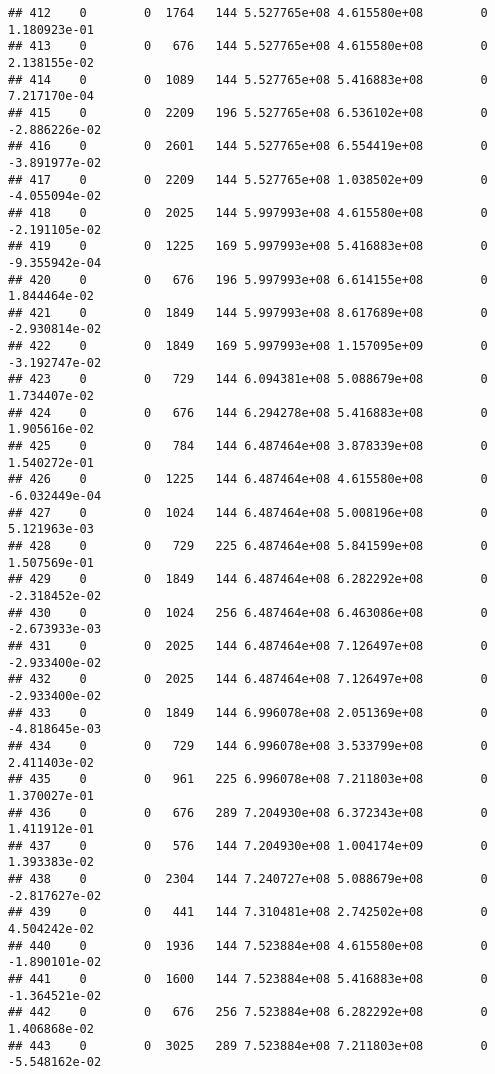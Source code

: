 \documentclass[
]{article}
\begin{document}
\begin{enumerate}
\begin{verbatim}
## 412    0        0  1764   144 5.527765e+08 4.615580e+08        0  1.180923e-01
## 413    0        0   676   144 5.527765e+08 4.615580e+08        0  2.138155e-02
## 414    0        0  1089   144 5.527765e+08 5.416883e+08        0  7.217170e-04
## 415    0        0  2209   196 5.527765e+08 6.536102e+08        0 -2.886226e-02
## 416    0        0  2601   144 5.527765e+08 6.554419e+08        0 -3.891977e-02
## 417    0        0  2209   144 5.527765e+08 1.038502e+09        0 -4.055094e-02
## 418    0        0  2025   144 5.997993e+08 4.615580e+08        0 -2.191105e-02
## 419    0        0  1225   169 5.997993e+08 5.416883e+08        0 -9.355942e-04
## 420    0        0   676   196 5.997993e+08 6.614155e+08        0  1.844464e-02
## 421    0        0  1849   144 5.997993e+08 8.617689e+08        0 -2.930814e-02
## 422    0        0  1849   169 5.997993e+08 1.157095e+09        0 -3.192747e-02
## 423    0        0   729   144 6.094381e+08 5.088679e+08        0  1.734407e-02
## 424    0        0   676   144 6.294278e+08 5.416883e+08        0  1.905616e-02
## 425    0        0   784   144 6.487464e+08 3.878339e+08        0  1.540272e-01
## 426    0        0  1225   144 6.487464e+08 4.615580e+08        0 -6.032449e-04
## 427    0        0  1024   144 6.487464e+08 5.008196e+08        0  5.121963e-03
## 428    0        0   729   225 6.487464e+08 5.841599e+08        0  1.507569e-01
## 429    0        0  1849   144 6.487464e+08 6.282292e+08        0 -2.318452e-02
## 430    0        0  1024   256 6.487464e+08 6.463086e+08        0 -2.673933e-03
## 431    0        0  2025   144 6.487464e+08 7.126497e+08        0 -2.933400e-02
## 432    0        0  2025   144 6.487464e+08 7.126497e+08        0 -2.933400e-02
## 433    0        0  1849   144 6.996078e+08 2.051369e+08        0 -4.818645e-03
## 434    0        0   729   144 6.996078e+08 3.533799e+08        0  2.411403e-02
## 435    0        0   961   225 6.996078e+08 7.211803e+08        0  1.370027e-01
## 436    0        0   676   289 7.204930e+08 6.372343e+08        0  1.411912e-01
## 437    0        0   576   144 7.204930e+08 1.004174e+09        0  1.393383e-02
## 438    0        0  2304   144 7.240727e+08 5.088679e+08        0 -2.817627e-02
## 439    0        0   441   144 7.310481e+08 2.742502e+08        0  4.504242e-02
## 440    0        0  1936   144 7.523884e+08 4.615580e+08        0 -1.890101e-02
## 441    0        0  1600   144 7.523884e+08 5.416883e+08        0 -1.364521e-02
## 442    0        0   676   256 7.523884e+08 6.282292e+08        0  1.406868e-02
## 443    0        0  3025   289 7.523884e+08 7.211803e+08        0 -5.548162e-02

\end{verbatim}
\end{enumerate}
\end{document}
